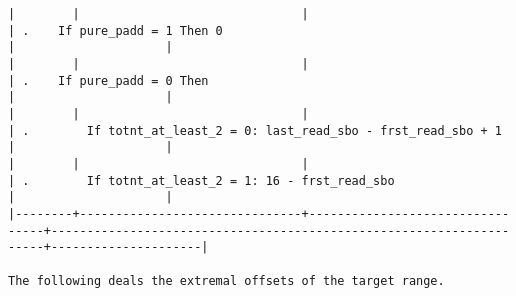 \documentclass[varwidth=\maxdimen,margin=0.5cm,multi={verbatim}]{standalone}
\begin{document}
\begin{verbatim}
|        |                               |                                 | .    If pure_padd = 1 Then 0                                        |                     |
|        |                               |                                 | .    If pure_padd = 0 Then                                          |                     |
|        |                               |                                 | .        If totnt_at_least_2 = 0: last_read_sbo - frst_read_sbo + 1 |                     |
|        |                               |                                 | .        If totnt_at_least_2 = 1: 16 - frst_read_sbo                |                     |
|--------+-------------------------------+---------------------------------+---------------------------------------------------------------------+---------------------|

The following deals the extremal offsets of the target range.


\end{verbatim}
\end{document}
